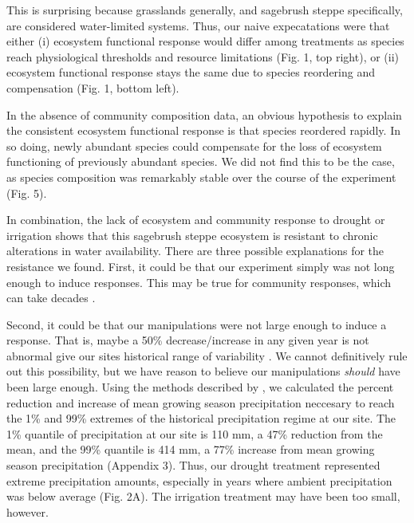 \documentclass[fleqn,10pt,lineno]{wlpeerj} %
\begin{document}
This is surprising because grasslands generally, and sagebrush steppe
specifically, are considered water-limited systems. Thus, our naive
expecatations were that either (i) ecosystem functional response would
differ among treatments as species reach physiological thresholds and
resource limitations (Fig. 1, top right), or (ii) ecosystem functional
response stays the same due to species reordering and compensation (Fig.
1, bottom left).

In the absence of community composition data, an obvious hypothesis to
explain the consistent ecosystem functional response is that species
reordered rapidly. In so doing, newly abundant species could compensate
for the loss of ecosystem functioning of previously abundant species. We
did not find this to be the case, as species composition was remarkably
stable over the course of the experiment (Fig. 5).

In combination, the lack of ecosystem and community response to drought
or irrigation shows that this sagebrush steppe ecosystem is resistant to
chronic alterations in water availability. There are three possible
explanations for the resistance we found. First, it could be that our
experiment simply was not long enough to induce responses. This may be
true for community responses, which can take decades \citep{Wilcox2016}.

Second, it could be that our manipulations were not large enough to
induce a response. That is, maybe a 50\% decrease/increase in any given
year is not abnormal give our sites historical range of variability
\citep{Knapp2017}. We cannot definitively rule out this possibility, but
we have reason to believe our manipulations \emph{should} have been
large enough. Using the methods described by \citet{Lemoine2016}, we
calculated the percent reduction and increase of mean growing season
precipitation neccesary to reach the 1\% and 99\% extremes of the
historical precipitation regime at our site. The 1\% quantile of
precipitation at our site is 110 mm, a 47\% reduction from the mean, and
the 99\% quantile is 414 mm, a 77\% increase from mean growing season
precipitation (Appendix 3). Thus, our drought treatment represented
extreme precipitation amounts, especially in years where ambient
precipitation was below average (Fig. 2A). The irrigation treatment may
have been too small, however.
\end{document}
